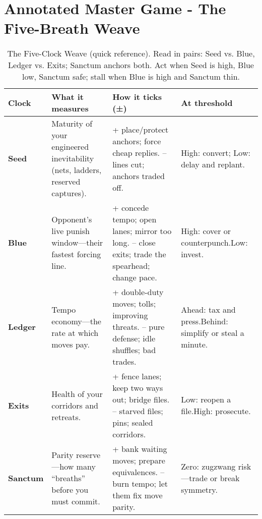 \section*{Annotated Master Game - The Five-Breath Weave}

\begin{table}[h]
\centering
\renewcommand{\arraystretch}{1.1}
\begin{tabular}{p{2.6cm} p{5.2cm} p{5.0cm} p{3.2cm}}
\hline
\textbf{Clock} & \textbf{What it measures} & \textbf{How it ticks (±)} & \textbf{At threshold} \\
\hline
\textbf{Seed} &
Maturity of your engineered inevitability (nets, ladders, reserved captures). &
{+ place/protect anchors; force cheap replies.\newline
-- lines cut; anchors traded off.} &
High: convert; Low: delay and replant. \\
\hline
\textbf{Blue} &
Opponent’s live punish window—their fastest forcing line. &
{+ concede tempo; open lanes; mirror too long.\newline
-- close exits; trade the spearhead; change pace.} &
High: cover or counterpunch.\newline Low: invest. \\
\hline
\textbf{Ledger} &
Tempo economy—the rate at which moves pay. &
{+ double-duty moves; tolls; improving threats.\newline
-- pure defense; idle shuffles; bad trades.} &
Ahead: tax and press.\newline Behind: simplify or steal a minute. \\
\hline
\textbf{Exits} &
Health of your corridors and retreats. &
{+ fence lanes; keep two ways out; bridge files.\newline
-- starved files; pins; sealed corridors.} &
Low: reopen a file.\newline High: prosecute. \\
\hline
\textbf{Sanctum} &
Parity reserve—how many “breaths” before you must commit. &
{+ bank waiting moves; prepare equivalences.\newline
-- burn tempo; let them fix move parity.} &
Zero: zugzwang risk—trade or break symmetry. \\
\hline
\end{tabular}
\caption{The Five-Clock Weave (quick reference). Read in pairs: Seed vs. Blue, Ledger vs. Exits; Sanctum anchors both. Act when Seed is high, Blue low, Sanctum safe; stall when Blue is high and Sanctum thin.}
\end{table}



